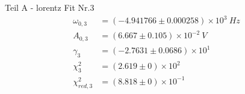 {\LARGE Teil A - lorentz Fit Nr.3}
\begin{align*}
	\omega_{0,3} &= \left(-4.941766 \pm 0.000258\right) \times 10^{3}\ Hz\\
	A_{0,3} &= \left(6.667 \pm 0.105\right) \times 10^{-2}\ V\\
	\gamma_3 &= \left(-2.7631 \pm 0.0686\right) \times 10^{1}\ \\
	\chi^2_{3} &= \left(2.619 \pm 0\right) \times 10^{2}\ \\
	\chi^2_{red,3} &= \left(8.818 \pm 0\right) \times 10^{-1}\ \\
\end{align*}